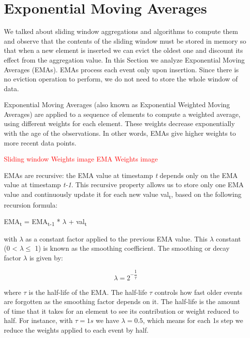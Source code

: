 \section{Exponential Moving Averages} \label{sec:emas}

We talked about sliding window aggregations and algorithms to compute them and observe that the contents of the sliding window must be stored in memory so that when a new element is inserted we can evict the oldest one and discount its effect from the aggregation value. In this Section we analyze Exponential Moving Averages (EMAs). EMAs process each event only upon insertion. Since there is no eviction operation to perform, we do not need to store the whole window of data.

Exponential Moving Averages (also known as Exponential Weighted Moving Averages) \cite{EMA-Everett2011} \cite{EMA-Hunter} \cite{EMA-MarcusB} are applied to a sequence of elements to compute a weighted average, using different weights for each element. These weights decrease exponentially with the age of the observations. In other words, EMAs give higher weights to more recent data points.

\textcolor{red}{Sliding window Weights image}
\textcolor{red}{EMA Weights image}




EMAs are recursive: the EMA value at timestamp \textit{t} depends only on the EMA value at timestamp \textit{t-1}. This recursive property allows us to store only one EMA value and continuously update it for each new value val\textsubscript{t}, based on the following recursion formula:

\begin{definition}
EMA\textsubscript{t} = EMA\textsubscript{t-1} * $\lambda$ + val\textsubscript{t}

\label{def:ema}
\end{definition}

with $\lambda$ as a constant factor applied to the previous EMA value. This $\lambda$ constant (0 < $\lambda \leq$ 1) is known as the smoothing coefficient. The smoothing or decay factor $\lambda$ is given by:

\[ \lambda = 2^{- \dfrac{1}{\tau}} \]


where $\tau$ is the half-life of the EMA. The half-life $\tau$ controls how fast older events are forgotten as the smoothing factor depends on it. The half-life is the amount of time that it takes for an element to see its contribution or weight reduced to half. For instance, with $\tau = 1s$ we have $\lambda = 0.5$, which means for each 1s step we reduce the weights applied to each event by half.




